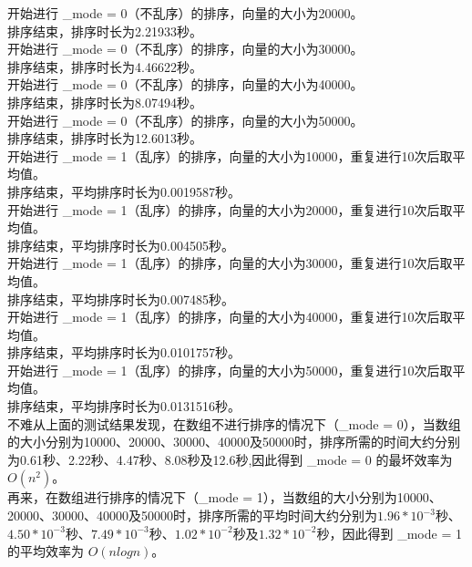 \documentclass[UTF8]{ctexart}
\begin{document}
开始进行 \_mode = 0（不乱序）的排序，向量的大小为20000。\\
排序结束，排序时长为2.21933秒。\\

开始进行 \_mode = 0（不乱序）的排序，向量的大小为30000。\\
排序结束，排序时长为4.46622秒。\\

开始进行 \_mode = 0（不乱序）的排序，向量的大小为40000。\\
排序结束，排序时长为8.07494秒。\\

开始进行 \_mode = 0（不乱序）的排序，向量的大小为50000。\\
排序结束，排序时长为12.6013秒。\\

开始进行 \_mode = 1（乱序）的排序，向量的大小为10000，重复进行10次后取平均值。\\
排序结束，平均排序时长为0.0019587秒。\\

开始进行 \_mode = 1（乱序）的排序，向量的大小为20000，重复进行10次后取平均值。\\
排序结束，平均排序时长为0.004505秒。\\

开始进行 \_mode = 1（乱序）的排序，向量的大小为30000，重复进行10次后取平均值。\\
排序结束，平均排序时长为0.007485秒。\\

开始进行 \_mode = 1（乱序）的排序，向量的大小为40000，重复进行10次后取平均值。\\
排序结束，平均排序时长为0.0101757秒。\\

开始进行 \_mode = 1（乱序）的排序，向量的大小为50000，重复进行10次后取平均值。\\
排序结束，平均排序时长为0.0131516秒。\\

不难从上面的测试结果发现，在数组不进行排序的情况下（\_mode = 0），当数组的大小分别为10000、20000、30000、40000及50000时，排序所需的时间大约分别为0.61秒、2.22秒、4.47秒、8.08秒及12.6秒,因此得到 \_mode = 0 的最坏效率为 $O(n^2)$。\\

再来，在数组进行排序的情况下（\_mode = 1），当数组的大小分别为10000、20000、30000、40000及50000时，排序所需的平均时间大约分别为$1.96*10^{-3}$秒、$4.50*10^{-3}$秒、$7.49*10^{-3}$秒、$1.02*10^{-2}$秒及$1.32*10^{-2}$秒，因此得到 \_mode = 1 的平均效率为 $O(nlogn)$。\\
\end{document}
